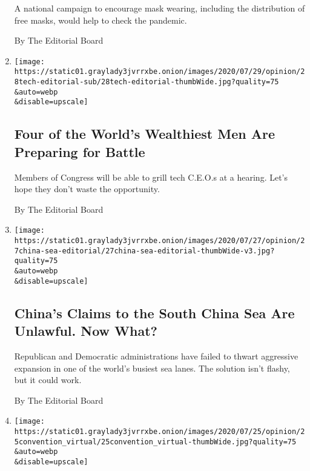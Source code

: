 \begin{enumerate}
  A national campaign to encourage mask wearing, including the
  distribution of free masks, would help to check the pandemic.

  By The Editorial Board
\item
  \href{/2020/07/28/opinion/tech-ceo-hearing-congress.html}{}

  \texttt{[image: https://static01.graylady3jvrrxbe.onion/images/2020/07/29/opinion/28tech-editorial-sub/28tech-editorial-thumbWide.jpg?quality=75\\\&auto=webp\\\&disable=upscale]}

  \hypertarget{four-of-the-worlds-wealthiest-men-are-preparing-for-battle}{%
  \subsection{Four of the World's Wealthiest Men Are Preparing for
  Battle}\label{four-of-the-worlds-wealthiest-men-are-preparing-for-battle}}

  Members of Congress will be able to grill tech C.E.O.s at a hearing.
  Let's hope they don't waste the opportunity.

  By The Editorial Board
\item
  \href{/2020/07/27/opinion/pompeo-south-china-sea.html}{}

  \texttt{[image: https://static01.graylady3jvrrxbe.onion/images/2020/07/27/opinion/27china-sea-editorial/27china-sea-editorial-thumbWide-v3.jpg?quality=75\\\&auto=webp\\\&disable=upscale]}

  \hypertarget{chinas-claims-to-the-south-china-sea-are-unlawful-now-what}{%
  \subsection{China's Claims to the South China Sea Are Unlawful. Now
  What?}\label{chinas-claims-to-the-south-china-sea-are-unlawful-now-what}}

  Republican and Democratic administrations have failed to thwart
  aggressive expansion in one of the world's busiest sea lanes. The
  solution isn't flashy, but it could work.

  By The Editorial Board
\item
  \href{/2020/07/25/opinion/sunday/republican-convention-trump.html}{}

  \texttt{[image: https://static01.graylady3jvrrxbe.onion/images/2020/07/25/opinion/25convention\_virtual/25convention\_virtual-thumbWide.jpg?quality=75\\\&auto=webp\\\&disable=upscale]}

  \hypertarget{the-pandemic-could-make-political-conventions-less-terrible}{%
}
\end{enumerate}
